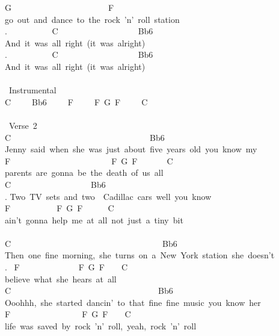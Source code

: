 {G\ \ \ \ \ \ \ \ \ \ \ \ \ \ \ \ \ \ \ \ \ \ \ F\\
go\ out\ and\ dance\ to\ the\ rock\ 'n'\ roll\ station\\
. \ \ \ \ \ \ \ \ \ \ C\ \ \ \ \ \ \ \ \ \ \ \ \ \ \ \ \ \ \ Bb6\\
And\ it\ was\ all\ right\ (it\ was\ alright)\\
. \ \ \ \ \ \ \ \ \ \ C\ \ \ \ \ \ \ \ \ \ \ \ \ \ \ \ \ \ \ Bb6\\
And\ it\ was\ all\ right\ (it\ was\ alright)\\
\\
\lbrack\ Instrumental\rbrack\\
C\ \ \ \ \ Bb6\ \ \ \ \ F\ \ \ \ \ F\ G\ F\ \ \ \ \ C\\
\\
\lbrack\ Verse\ 2\rbrack\\
C\ \ \ \ \ \ \ \ \ \ \ \ \ \ \ \ \ \ \ \ \ \ \ \ \ \ \ \ \ \ \ \ \ Bb6\\
Jenny\ said\ when\ she\ was\ just\ about\ five\ years\ old\ you\ know\ my\\
F\ \ \ \ \ \ \ \ \ \ \ \ \ \ \ \ \ \ \ \ \ \ \ \ F\ G\ F\ \ \ \ \ \ \ C\\
parents\ are\ gonna\ be\ the\ death\ of\ us\ all\\
C\ \ \ \ \ \ \ \ \ \ \ \ \ \ \ \ \ \ \ Bb6\\
. Two\ TV\ sets\ and\ two\ \ Cadillac\ cars\ well\ you\ know\\
F\ \ \ \ \ \ \ \ \ \ \ F\ G\ F\ \ \ \ \ \ C\\
ain't\ gonna\ help\ me\ at\ all\ not\ just\ a\ tiny\ bit\\
\\
C\ \ \ \ \ \ \ \ \ \ \ \ \ \ \ \ \ \ \ \ \ \ \ \ \ \ \ \ \ \ \ \ \ \ \ \ Bb6\\
Then\ one\ fine\ morning,\ she\ turns\ on\ a\ New\ York\ station\ she\ doesn't\\
. \ F\ \ \ \ \ \ \ \ \ \ \ \ \ \ F\ G\ F\ \ \ \ C\\
believe\ what\ she\ hears\ at\ all\\
C\ \ \ \ \ \ \ \ \ \ \ \ \ \ \ \ \ \ \ \ \ \ \ \ \ \ \ \ \ \ \ \ \ \ \ Bb6\\
Ooohhh,\ she\ started\ dancin'\ to\ that\ fine\ fine\ music\ you\ know\ her\\
F\ \ \ \ \ \ \ \ \ \ \ \ \ \ \ \ \ F\ G\ F\ \ \ \ C\\
life\ was\ saved\ by\ rock\ 'n'\ roll,\ yeah,\ rock\ 'n'\ roll\\
\\
}
